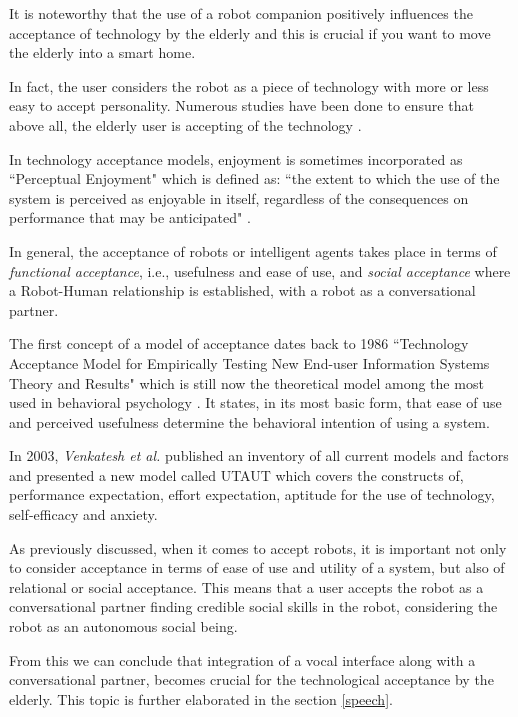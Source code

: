 \documentclass{thesisreport}
\begin{document}
 It is noteworthy that the use of a robot companion positively influences the acceptance of technology by the elderly and this is crucial if you want to move the elderly into a smart home.
 
 In fact, the user considers the robot as a piece of technology with more or less easy to accept personality.
 Numerous studies have been done to ensure that above all, the elderly user is accepting of the technology \cite{heerink2008influence, enjoymentModels,assistiveRobots}.
 
 In technology acceptance models, enjoyment is sometimes incorporated as ``Perceptual Enjoyment" which is defined as: ``the extent to which the use of the system is perceived as enjoyable in itself, regardless of the consequences on performance that may be anticipated" \cite{enjoymentModels, davis1992extrinsic}.
 
 In general, the acceptance of robots or intelligent agents takes place in terms of \emph{functional acceptance}, i.e., usefulness and ease of use, and \emph{social acceptance} where a Robot-Human relationship is established, with a robot as  a conversational partner.
 
 The first concept of a model of acceptance dates back to 1986 ``Technology Acceptance Model for Empirically Testing New End-user Information Systems Theory and Results" which is still now the theoretical model among the most used in behavioral psychology \cite{davis1985technology,enjoymentModels}.
 It states, in its most basic form, that ease of use and perceived usefulness determine the behavioral intention of using a system.
 
 In 2003, \textit{Venkatesh et al.} published an inventory of all current models and factors and presented a new model called UTAUT \cite{venkatesh2003user,enjoymentModels} which covers the constructs of, performance expectation, effort expectation, aptitude for the use of technology, self-efficacy and anxiety.
 
 As previously discussed, when it comes to accept robots, it is important not only to consider acceptance in terms of ease of use and utility of a system, but also of relational or social acceptance. This means that a user accepts the robot as a conversational partner finding credible social skills in the robot, considering the robot as an autonomous social being. 
 
 From this we can conclude that integration of a vocal interface along with a conversational partner, becomes crucial for the technological acceptance by the elderly. This topic is further elaborated in the section \ref{speech}.
 
\end{document}
